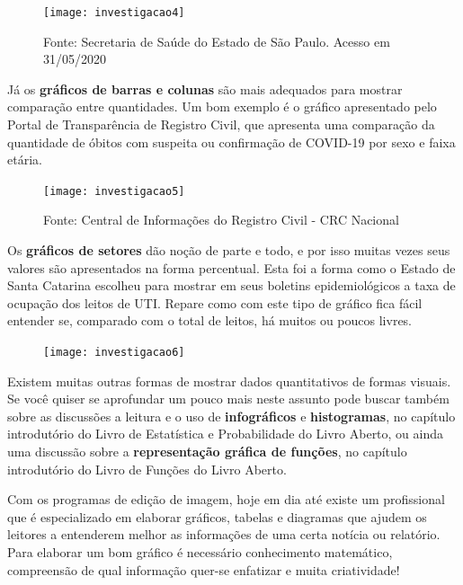 \begin{figure}[H]
\centering
\texttt{[image: investigacao4]}

\caption*{Fonte: Secretaria de Saúde do Estado de São Paulo. Acesso em 31/05/2020}
\end{figure}

Já os \textbf{gráficos de barras e colunas} são mais adequados para mostrar comparação entre quantidades. Um bom exemplo é o gráfico apresentado pelo Portal de Transparência de Registro Civil, que apresenta uma comparação da quantidade de óbitos com suspeita ou confirmação de COVID-19 por sexo e faixa etária.

\begin{figure}[H]
\centering
\texttt{[image: investigacao5]}

\caption{Fonte: Central de Informações do Registro Civil - CRC Nacional}
\end{figure}

Os \textbf{gráficos de setores} dão noção de parte e todo, e por isso muitas vezes seus valores são apresentados na forma percentual. Esta foi a forma como o Estado de Santa Catarina escolheu para mostrar em seus boletins epidemiológicos a taxa de ocupação dos leitos de UTI. Repare como com este tipo de gráfico fica fácil entender se, comparado com o total de leitos, há muitos ou poucos livres.

\begin{figure}[H]
\centering
\texttt{[image: investigacao6]}

\end{figure}


Existem muitas outras formas de mostrar dados quantitativos de formas visuais. Se você quiser se aprofundar um pouco mais neste assunto pode buscar também sobre as discussões a leitura e o uso de \textbf{infográficos} e \textbf{histogramas}, no capítulo introdutório do Livro de Estatística e Probabilidade do Livro Aberto, ou ainda uma discussão sobre a \textbf{representação gráfica de funções}, no capítulo introdutório do Livro de Funções do Livro Aberto. 

Com os programas de edição de imagem, hoje em dia até existe um profissional que é especializado em elaborar gráficos, tabelas e diagramas que ajudem os leitores a entenderem melhor as informações de uma certa notícia ou relatório. Para elaborar um bom gráfico é necessário conhecimento matemático, compreensão de qual informação quer-se enfatizar e muita criatividade!

